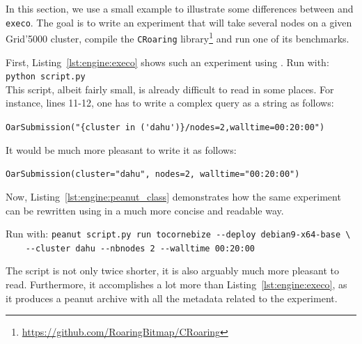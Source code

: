             In this section, we use a small example to illustrate some differences between \peanut and
            \texttt{execo}. The goal is to write an experiment that will take several nodes on a given Grid'5000
            cluster, compile the \texttt{CRoaring} library\footnote{\url{https://github.com/RoaringBitmap/CRoaring}} and
            run one of its benchmarks.

            \lstset{basicstyle=\scriptsize, style=custom_lst_style}

            First, Listing~\ref{lst:engine:execo} shows such an experiment using \execo. Run with: \verb#python script.py#\\

            

            This script, albeit fairly small, is already difficult to read in some places. For instance, lines 11-12,
            one has to write a complex query as a string as follows:

            \verb#OarSubmission("{cluster in ('dahu')}/nodes=2,walltime=00:20:00")#

            It would be much more pleasant to write it as follows:

            \verb#OarSubmission(cluster="dahu", nodes=2, walltime="00:20:00")#

            Now, Listing~\ref{lst:engine:peanut_class} demonstrates how the same experiment can be rewritten using
            \peanut in a much more concise and readable way.

            Run with: \verb#peanut script.py run tocornebize --deploy debian9-x64-base \#\\
            \verb#    --cluster dahu --nbnodes 2 --walltime 00:20:00#

            

            The script is not only twice shorter, it is also arguably much more pleasant to read. Furthermore, it
            accomplishes a lot more than Listing~\ref{lst:engine:execo}, as it produces a peanut archive with all the
            metadata related to the experiment.

